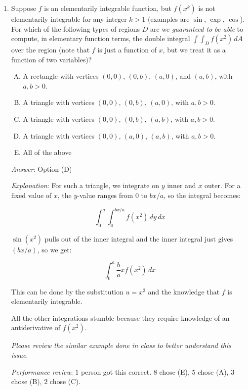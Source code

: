 \documentclass[10pt]{amsart}
\begin{document}
\begin{enumerate}
  {\em Answer}: Option (C)

  {\em Explanation}: Note that the integration is over $[s,t] \times
  [u,v]$, i.e., the rectangular region with corner points $(s,u)$,
  $(s,v)$, $(t,u)$, and $(t,v)$. Recall that for the double integral,
  we put positive signs on the two extreme points (top right and
  bottom left) and negative signs on the other two points (top left
  and bottom right). See more in the lecture notes.

  {\em Performance review}: $8$ people got this correct. $6$ people
  chose (D), $2$ each chose (A) and (E), $1$ chose (B).

\item Suppose $f$ is an elementarily integrable function, but $f(x^k)$
  is not elementarily integrable for any integer $k > 1$ (examples are
  $\sin$, $\exp$, $\cos$). For which of the following types of regions
  $D$ are we {\em guaranteed to be able} to compute, in elementary
  function terms, the double integral $\int \int_D f(x^2) \, dA$ over
  the region (note that $f$ is just a function of $x$, but we treat it
  as a function of two variables)?

  \begin{enumerate}[(A)]
  \item A rectangle with vertices $(0,0)$, $(0,b)$, $(a,0)$, and
    $(a,b)$, with $a,b > 0$.
  \item A triangle with vertices $(0,0)$, $(0,b)$, $(a,0)$, with $a, b
    > 0$.
  \item A triangle with vertices $(0,0)$, $(0,b)$, $(a,b)$, with $a, b
    > 0$.
  \item A triangle with vertices $(0,0)$, $(a,0)$, $(a,b)$, with $a, b
    > 0$.
  \item All of the above
  \end{enumerate}

  {\em Answer}: Option (D)

  {\em Explanation}: For such a triangle, we integrate on $y$ inner
  and $x$ outer. For a fixed value of $x$, the $y$-value ranges from
  $0$ to $bx/a$, so the integral becomes:

  $$\int_0^a \int_0^{bx/a} f(x^2) \, dy \, dx$$

  $\sin(x^2)$ pulls out of the inner integral and the inner integral
  just gives $(bx/a)$, so we get:

  $$\int_0^a \frac{b}{a} xf(x^2) \, dx$$

  This can be done by the substitution $u = x^2$ and the knowledge
  that $f$ is elementarily integrable.

  All the other integrations stumble because they require knowledge of
  an antiderivative of $f(x^2)$.

  {\em Please review the similar example done in class to better
    understand this issue}.

  {\em Performance review}: $1$ person got
  this correct. $8$ chose (E), $5$ chose (A), $3$ chose (B), $2$ chose
  (C).
\end{enumerate}
\end{document}

